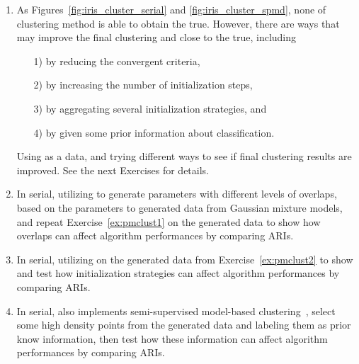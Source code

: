 \begin{enumerate}[label=\thechapter-\arabic*]

\item
As Figures~\ref{fig:iris_cluster_serial} and \ref{fig:iris_cluster_spmd},
none of clustering method is able to obtain the true. However, there are
ways that may improve the final clustering and close to the true, including
\begin{itemize}
\item[1)] by reducing the convergent criteria,
\item[2)] by increasing the number of initialization steps,
\item[3)] by aggregating several initialization strategies, and
\item[4)] by given some prior information about classification.
\end{itemize}
Using  as a data, and trying different ways to see if
final clustering results are improved.
See the next Exercises for details.
\label{ex:pmclust1}

\item
In serial,
utilizing  to generate parameters with different levels of
overlaps, based on the parameters to generated data from Gaussian mixture
models, and repeat Exercise~\ref{ex:pmclust1} on the generated data
to show how overlaps can affect algorithm performances by comparing ARIs.
\label{ex:pmclust2}

\item
In serial,
utilizing  on the generated data from Exercise~\ref{ex:pmclust2}
to show and test how initialization strategies can affect algorithm
performances by comparing ARIs.

\item
In serial,
 also implements semi-supervised model-based
clustering~, select some high density points
from the generated data and labeling them as prior know information, then
test how these information can affect algorithm performances
by comparing ARIs.

\end{enumerate}

